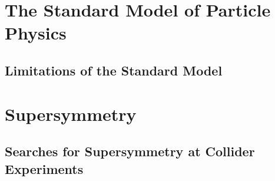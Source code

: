 \section{The Standard Model of Particle Physics}
\label{sec:sm}

\subsection{Limitations of the Standard Model}
\label{subsec:sm_shortcomings}

\section{Supersymmetry}
\label{sec:susy}

\subsection{Searches for Supersymmetry at Collider Experiments}
\label{subsec:susy_status}


